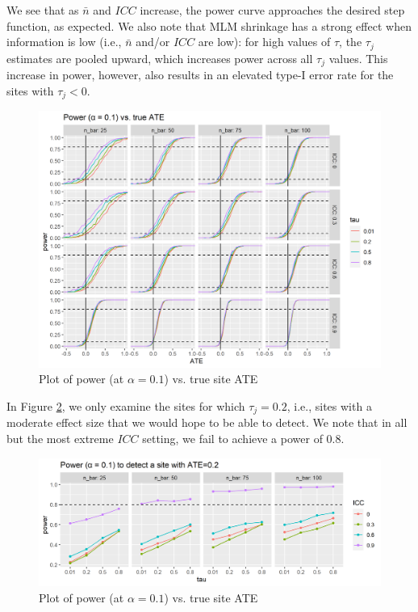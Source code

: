 \documentclass[]{article}
\begin{document}
We see that as $\bar{n}$ and $ICC$ increase, the power curve approaches the desired step function, as expected.
We also note that MLM shrinkage has a strong effect when information is low (i.e., $\bar{n}$ and/or $ICC$ are low): for high values of $\tau$, the $\tau_j$ estimates are pooled upward, which increases power across all $\tau_j$ values.
This increase in power, however, also results in an elevated type-I error rate for the sites with $\tau_j < 0$.

\begin{figure}[ht]
	\centering
	\includegraphics[width=\textwidth]{power_plot}
	\caption{Plot of power (at $\alpha = 0.1$) vs. true site ATE}
	\label{fig:power_plot}
\end{figure}

In Figure \ref{fig:power_plot_ATE02}, we only examine the sites for which $\tau_j = 0.2$, i.e., sites with a moderate effect size that we would hope to be able to detect.
We note that in all but the most extreme $ICC$ setting, we fail to achieve a power of 0.8.

\begin{figure}[ht]
	\centering
	\includegraphics[width=\textwidth]{power_plot_ATE02}
	\caption{Plot of power (at $\alpha = 0.1$) vs. true site ATE}
	\label{fig:power_plot_ATE02}
\end{figure}
\end{document}
